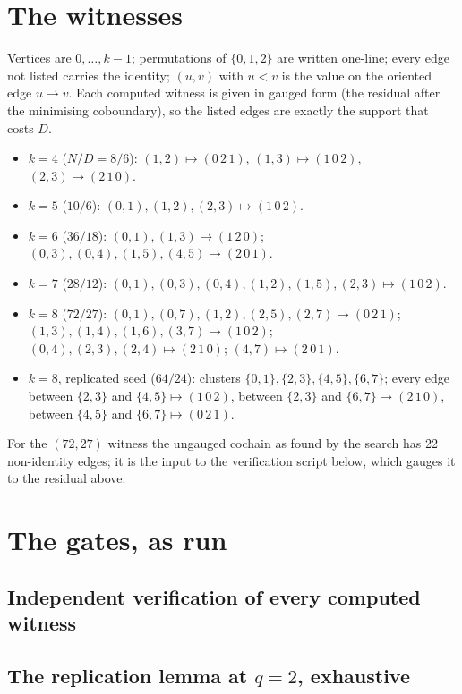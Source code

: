 \documentclass[11pt]{article}
\theoremstyle{remark}\newtheorem{remark}[theorem]{Remark}
\begin{document}
\appendix
\section{The witnesses}\label{sec:witnesses}
Vertices are $0,\dots,k-1$; permutations of $\{0,1,2\}$ are written one-line; every edge not listed carries the identity; $(u,v)$ with $u<v$ is the value on the oriented edge $u\to v$. Each computed witness is given in gauged form (the residual after the minimising coboundary), so the listed edges are exactly the support that costs $D$.
\begin{itemize}\small\renewcommand{\labelitemi}{--}
\item $k=4$ ($N/D=8/6$): $(1,2)\mapsto(0\,2\,1)$, $(1,3)\mapsto(1\,0\,2)$, $(2,3)\mapsto(2\,1\,0)$.
\item $k=5$ ($10/6$): $(0,1),(1,2),(2,3)\mapsto(1\,0\,2)$.
\item $k=6$ ($36/18$): $(0,1),(1,3)\mapsto(1\,2\,0)$; $(0,3),(0,4),(1,5),(4,5)\mapsto(2\,0\,1)$.
\item $k=7$ ($28/12$): $(0,1),\allowbreak(0,3),\allowbreak(0,4),\allowbreak(1,2),\allowbreak(1,5),\allowbreak(2,3)\mapsto(1\,0\,2)$.
\item $k=8$ ($72/27$): $(0,1),\allowbreak(0,7),\allowbreak(1,2),\allowbreak(2,5),\allowbreak(2,7)\mapsto(0\,2\,1)$; $(1,3),\allowbreak(1,4),\allowbreak(1,6),\allowbreak(3,7)\mapsto(1\,0\,2)$; $(0,4),\allowbreak(2,3),\allowbreak(2,4)\mapsto(2\,1\,0)$; $(4,7)\mapsto(2\,0\,1)$.
\item $k=8$, replicated seed ($64/24$): clusters $\{0,1\},\{2,3\},\{4,5\},\{6,7\}$; every edge between $\{2,3\}$ and $\{4,5\}\mapsto(1\,0\,2)$, between $\{2,3\}$ and $\{6,7\}\mapsto(2\,1\,0)$, between $\{4,5\}$ and $\{6,7\}\mapsto(0\,2\,1)$.
\end{itemize}
For the $(72,27)$ witness the ungauged cochain as found by the search has 22 non-identity edges; it is the input to the verification script below, which gauges it to the residual above.

\section{The gates, as run}\label{sec:gates}
\subsection*{Independent verification of every computed witness}

\subsection*{The replication lemma at \texorpdfstring{$q=2$}{q=2}, exhaustive}

\end{document}
